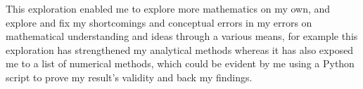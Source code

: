 {This exploration enabled me to explore more mathematics on my own, and explore and fix my shortcomings and conceptual errors in my errors on mathematical understanding and ideas through a various means, for example this exploration has strengthened my analytical methods whereas it has also exposed me to a list of numerical methods, which could be evident by me using a Python script to prove my result's validity and back my findings.}

